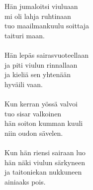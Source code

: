 
        Hän jumaloitsi viuluaan \\
        mi oli lahja ruhtinaan \\
        tuo maailmankuulu soittaja \\
        taituri maan. \\
\hspace{10mm} \\
        Hän lepäs sairasvuoteellaan \\
        ja piti viulun rinnallaan \\
        ja kieliä sen yhtenään \\
        hyväili vaan. \\
\hspace{10mm} \\
        Kun kerran yössä valvoi \\
        tuo sisar valkoinen \\
        hän soiton kumman kuuli \\
        niin oudon sävelen. \\
\hspace{10mm} \\
        Kun hän riensi sairaan luo \\
        hän näki viulun särkyneen \\
        ja taitoniekan nukkuneen \\
        ainiaaks pois. \\
